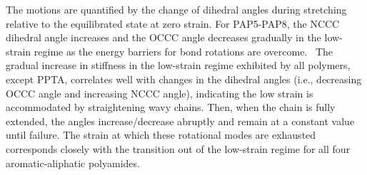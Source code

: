 \documentclass[journal=langd5,manuscript=article]{achemso}
\begin{document}
The motions are quantified by the change of dihedral angles during stretching relative to the equilibrated state at zero strain.
For PAP5-PAP8, the NCCC dihedral angle increases and the OCCC angle decreases gradually in the low-strain regime as the energy barriers for bond rotations are overcome.~\cite{tonelli2020poly} 
The gradual increase in stiffness in the low-strain regime exhibited by all polymers, except PPTA, correlates well with changes in the dihedral angles (i.e., decreasing OCCC angle and increasing NCCC angle), indicating the low strain is accommodated by straightening wavy chains.
Then, when the chain is fully extended, the angles increase/decrease abruptly and remain at a constant value until failure.  
The strain at which these rotational modes are exhausted corresponds closely with the transition out of the low-strain regime for all four aromatic-aliphatic polyamides.
\end{document}
